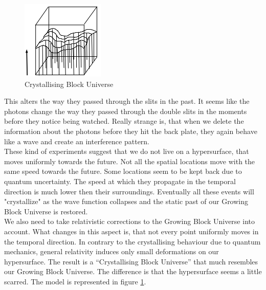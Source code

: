 \documentclass[11pt, a4 paper]{article}
\begin{document}
\begin{multicols}{2}
\begin{figure}
\includegraphics[width=\linewidth]{crystal.png}
\caption{Crystallising Block Universe \cite{crystal}}
\label{fig:3}
\end{figure}
This alters the way they passed through the slits in the past. It seems like the photons change the way they passed through the double slits in the moments before they notice being watched. Really strange is, that when we delete the information about the photons before they hit the back plate, they again behave like a wave and create an interference pattern.\\
These kind of experiments suggest that we do not live on a hypersurface, that moves uniformly towards the future. Not all the spatial locations move with the same speed towards the future. Some locations seem to be kept back due to quantum uncertainty. The speed at which they propagate in the temporal direction is much lower then their surroundings. Eventually all these events will "crystallize" as the wave function collapses and the static past of our Growing Block Universe is restored.\\
We also need to take relativistic corrections to the Growing Block Universe into account. What changes in this aspect is, that not every point uniformly moves in the temporal direction. In contrary to the crystallising behaviour due to quantum mechanics, general relativity induces only small deformations on our hypersurface. The result is a ``Crystallising Block Universe''\cite{crystal} that much resembles our Growing Block Universe. The difference is that the hypersurface seems a little scarred. The model is represented in figure \ref{fig:3}.
\end{multicols}
\end{document}
